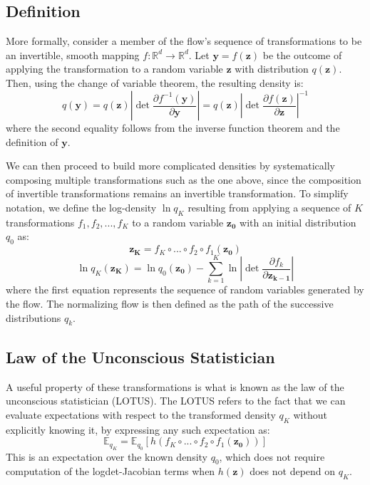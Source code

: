 \subsection{Definition}

More formally, consider a member of the flow's sequence of transformations to be an invertible, smooth mapping $f:\mathbb{R}^d \rightarrow \mathbb{R}^d$. Let $\mathbf{y}=f(\mathbf{z})$ be the outcome of applying the transformation to a random variable $\mathbf{z}$ with distribution $q(\mathbf{z})$. Then, using the change of variable theorem, the resulting density is:
\[ q(\mathbf{y}) = q(\mathbf{z}) \left| \det \frac{\partial f^{-1}(\mathbf{y})}{\partial \mathbf{y}}  \right| = q(\mathbf{z}) \left| \det \frac{\partial f(\mathbf{z})}{\partial \mathbf{z}} \right| ^ {-1} \]
where the second equality follows from the inverse function theorem and the definition of $\mathbf{y}$.

We can then proceed to build more complicated densities by systematically composing multiple transformations such as the one above, since the composition of invertible transformations remains an invertible transformation. To simplify notation, we define the log-density $\ln q_K$ resulting from applying a sequence of $K$ transformations $f_1,f_2,...,f_K$ to a random variable $\mathbf{z_0}$ with an initial distribution $q_0$ as:
\[ \mathbf{z_K} = f_K \circ ... \circ f_2 \circ f_1(\mathbf{z_0}) \]
\[ \ln q_K(\mathbf{z_K}) = \ln q_0(\mathbf{z_0}) - \sum_{k=1}^{K} \ln \left| \det \frac{\partial f_k}{\partial \mathbf{z_{k-1}}} \right|  \]
where the first equation represents the sequence of random variables generated by the flow.  The normalizing flow is then defined as the path of the successive distributions $q_k$. 

\subsection{Law of the Unconscious Statistician}
A useful property of these transformations is what is known as the law of the unconscious statistician (LOTUS). The LOTUS refers to the fact that we can evaluate expectations with respect to the transformed density $q_K$ without explicitly knowing it, by expressing any such expectation as:
\[ \mathbb{E}_{q_K} = \mathbb{E}_{q_0}[h(f_K \circ ... \circ f_2 \circ f_1(\mathbf{z_0}))] \]
This is an expectation over the known density $q_0$, which does not require computation of the logdet-Jacobian terms when $h(\mathbf{z})$ does not depend on $q_K$.


